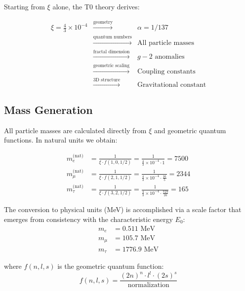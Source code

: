 	Starting from $\xi$ alone, the T0 theory derives:
	
	\begin{equation}
		\begin{array}{rcl}
			\xi = \frac{4}{3} \times 10^{-4} & \xrightarrow{\text{geometry}} & \alpha = 1/137\\
			& \xrightarrow{\text{quantum numbers}} & \text{All particle masses}\\
			& \xrightarrow{\text{fractal dimension}} & g-2 \text{ anomalies}\\
			& \xrightarrow{\text{geometric scaling}} & \text{Coupling constants}\\
			& \xrightarrow{\text{3D structure}} & \text{Gravitational constant}
		\end{array}
	\end{equation}
	
	\subsection{Mass Generation}
	
	All particle masses are calculated directly from $\xi$ and geometric quantum functions. In natural units we obtain:
	
	\begin{align}
		m_e^{\text{(nat)}} &= \frac{1}{\xi \cdot f(1,0,1/2)} = \frac{1}{\frac{4}{3} \times 10^{-4} \cdot 1} = 7500 \\
		m_\mu^{\text{(nat)}} &= \frac{1}{\xi \cdot f(2,1,1/2)} = \frac{1}{\frac{4}{3} \times 10^{-4} \cdot \frac{16}{5}} = 2344 \\
		m_\tau^{\text{(nat)}} &= \frac{1}{\xi \cdot f(3,2,1/2)} = \frac{1}{\frac{4}{3} \times 10^{-4} \cdot \frac{729}{16}} = 165
	\end{align}
	
	The conversion to physical units (MeV) is accomplished via a scale factor that emerges from consistency with the characteristic energy $E_0$:
	\begin{align}
		m_e &= 0.511 \text{ MeV} \\
		m_\mu &= 105.7 \text{ MeV} \\
		m_\tau &= 1776.9 \text{ MeV}
	\end{align}
	
	where $f(n,l,s)$ is the geometric quantum function:
	\begin{equation}
		f(n,l,s) = \frac{(2n)^n \cdot l^l \cdot (2s)^s}{\text{normalization}}
	\end{equation}
	
